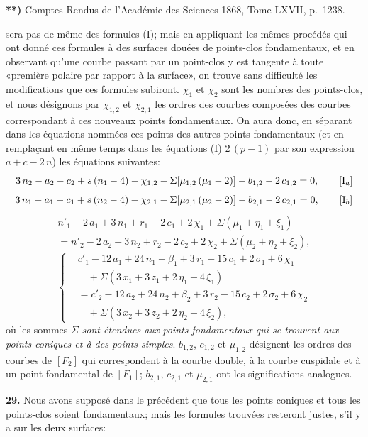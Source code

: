 \documentclass{article}
\begin{document}
\textbf{**)} Comptes Rendus de l'Académie des Sciences 1868, Tome LXVII, p.~1238.

sera pas de même des formules (I); mais en appliquant les mêmes procédés qui ont donné ces formules à des surfaces douées de points-clos fondamentaux, et en observant qu'une courbe passant par un point-clos y est tangente à toute «première polaire par rapport à la surface», on trouve sans difficulté les modifications que ces formules subiront. $\chi_1$ et $\chi_2$ sont les nombres des points-clos, et nous désignons par $\chi_{1, 2}$ et $\chi_{2, 1}$ les ordres des courbes composées des courbes correspondant à ces nouveaux points fondamentaux. On aura donc, en séparant dans les équations nommées ces points des autres points fondamentaux (et en remplaçant en même temps dans les équations (I) $2\,(p - 1)$ par son expression $a + c - 2\,n$) les équations suivantes:
\[
3\,n_2 - a_2 - c_2 + s\,(n_1 - 4) - \chi_{1, 2} - \Sigma[\mu_{1, 2}\,(\mu_1 - 2)] - b_{1, 2} - 2\,c_{1, 2} = 0, \tag*{[$\mathrm{I}_a$]}
\]
\[
3\,n_1 - a_1 - c_1 + s\,(n_2 - 4) - \chi_{2, 1} - \Sigma[\mu_{2, 1}\,(\mu_2 - 2)] - b_{2, 1} - 2\,c_{2, 1} = 0, \tag*{[$\mathrm{I}_b$]}
\]
\[
\begin{aligned}
n'_1 - 2\,a_1 + 3\,n_1 + r_1 - 2\,c_1 + 2\,\chi_1 + \Sigma(\mu_1 + \eta_1 + \xi_1) \\
= n'_2 - 2\,a_2 + 3\,n_2 + r_2 - 2\,c_2 + 2\,\chi_2 + \Sigma(\mu_2 + \eta_2 + \xi_2),
\end{aligned} \tag*{[II]}
\]
\[
\left\{
\begin{aligned}
& c'_1 - 12\,a_1 + 24\,n_1 + \beta_1 + 3\,r_1 - 15\,c_1 + 2\,\sigma_1 + 6\,\chi_1 \\
&\quad + \Sigma(3\,x_1 + 3\,z_1 + 2\,\eta_1 + 4\,\xi_1) \\
&= c'_2 - 12\,a_2 + 24\,n_2 + \beta_2 + 3\,r_2 - 15\,c_2 + 2\,\sigma_2 + 6\,\chi_2 \\
&\quad + \Sigma(3\,x_2 + 3\,z_2 + 2\,\eta_2 + 4\,\xi_2),
\end{aligned}
\right. \tag*{[III]}
\]
où les sommes $\Sigma$ \emph{sont étendues aux points fondamentaux qui se trouvent aux points coniques et à des points simples}. $b_{1, 2}$, $c_{1, 2}$ et $\mu_{1, 2}$ désignent les ordres des courbes de $[F_2]$ qui correspondent à la courbe double, à la courbe cuspidale et à un point fondamental de $[F_1]$; $b_{2, 1}$, $c_{2, 1}$ et $\mu_{2, 1}$ ont les significations analogues.

\textbf{29.} Nous avons supposé dans le \no précédent que tous les points coniques et tous les points-clos soient fondamentaux; mais les formules trouvées resteront justes, s'il y a sur les deux surfaces:
\end{document}
